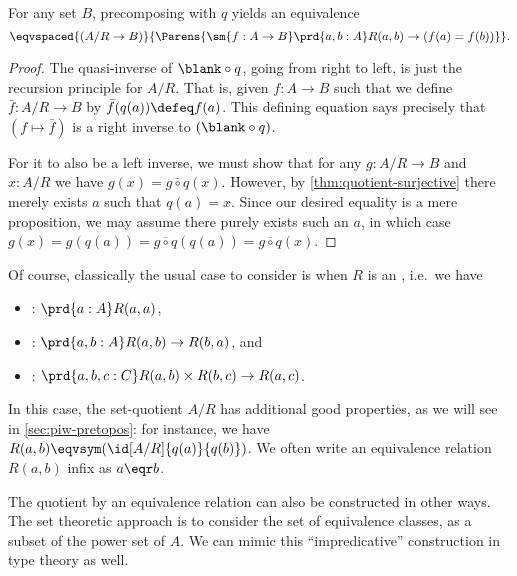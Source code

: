 \begin{lem}\label{thm:quotient-ump}
  For any set $B$, precomposing with $q$ yields an equivalence
  \[ \eqvspaced{(A/R \to B)}{\Parens{\sm{f:A\to B} \prd{a,b:A} R(a,b) \to (f(a)=f(b))}}.\]
\end{lem}
\begin{proof}
  The quasi-inverse of $\blank\circ q$, going from right to left, is just the recursion principle for $A/R$.
  That is, given $f:A\to B$ such that
   we define $\bar f:A/R\to B$ by $\bar f(q(a))\defeq f(a)$.
  This defining equation says precisely that $(f\mapsto \bar f)$ is a right inverse to $(\blank\circ q)$.

  For it to also be a left inverse, we must show that for any $g:A/R\to B$ and $x:A/R$ we have $g(x) = \overline{g\circ q}(x)$.
  However, by \cref{thm:quotient-surjective} there merely exists $a$ such that $q(a)=x$.
  Since our desired equality is a mere proposition, we may assume there purely exists such an $a$, in which case $g(x) = g(q(a)) = \overline{g\circ q}(q(a)) = \overline{g\circ q}(x)$.
\end{proof}

Of course, classically the usual case to consider is when $R$ is an , i.e.\ we have
%
%
%
\begin{itemize}
\item {}: $\prd{a:A} R(a,a)$,
\item {}: $\prd{a,b:A} R(a,b) \to R(b,a)$, and
\item {}: $\prd{a,b,c:C} R(a,b) \times R(b,c) \to R(a,c)$.
\end{itemize}
%
In this case, the set-quotient $A/R$ has additional good properties, as we will see in \cref{sec:piw-pretopos}: for instance, we have $R(a,b) \eqvsym (\id[A/R]{q(a)}{q(b)})$.
We often write an equivalence relation $R(a,b)$ infix as $a\eqr b$.

The quotient by an equivalence relation can also be constructed in other ways.
The set theoretic approach is to consider the set of equivalence classes, as a subset of the power set of $A$.
We can mimic this ``impredicative'' construction in type theory as well.

